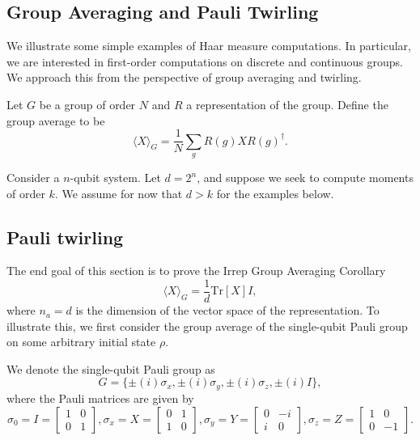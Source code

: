 \subsection{Group Averaging and Pauli Twirling}
We illustrate some simple examples of Haar measure computations.
In particular, we are interested in first-order computations on discrete and continuous groups.
We approach this from the perspective of group averaging and twirling.
\begin{definition}\label{def:GroupAverage}
    Let $G$ be a group of order $N$ and $R$ a representation of the group.
    Define the {group average} to be
    \begin{equation}
        \langle X \rangle_{G} = \frac{1}{N} \sum_{g} R(g) X R(g)^{\dagger}.
    \end{equation}
\end{definition}

\begin{remark}[Assumptions]
    Consider a $n$-qubit system. Let $d = 2^n$, and suppose we seek to compute moments of order $k$.
    We assume for now that $d > k$ for the examples below.
\end{remark}

\subsection{Pauli twirling}
The end goal of this section is to prove the Irrep Group Averaging Corollary
\begin{equation}
    \langle X \rangle_{G} = \frac{1}{d} \text{Tr}[X] I,
\end{equation}
where $n_a = d$ is the dimension of the vector space of the representation.
To illustrate this, we first consider the group average of the single-qubit Pauli group on some arbitrary initial state $\rho$.
\begin{remark}\label{rm:PauliGroup}
    We denote the single-qubit Pauli group as
    \begin{equation}
        G = \{\pm(i) \sigma_{x}, \pm(i) \sigma_y, \pm (i) \sigma_z, \pm (i) I\},
    \end{equation}
    where the Pauli matrices are given by
    \begin{equation}
        \sigma_0 = I = \begin{bmatrix} 1 & 0 \\ 0 & 1 \end{bmatrix},
        \sigma_{x} = X = \begin{bmatrix} 0 & 1 \\ 1 & 0 \end{bmatrix},
        \sigma_y = Y = \begin{bmatrix} 0 & -i \\ i & 0 \end{bmatrix},
        \sigma_z = Z = \begin{bmatrix} 1 & 0 \\ 0 & -1 \end{bmatrix}.
    \end{equation}
\end{remark}

